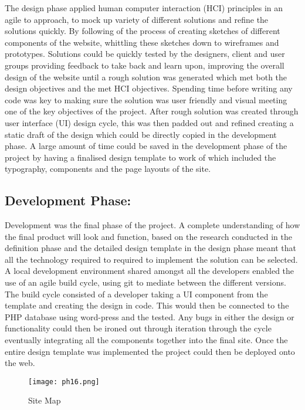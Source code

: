 The design phase applied human computer interaction (HCI) principles in
an agile to approach, to mock up variety of different solutions and
refine the solutions quickly. By following of the process of creating
sketches of different components of the website, whittling these
sketches down to wireframes and prototypes. Solutions could be quickly
tested by the designers, client and user groups providing feedback to
take back and learn upon, improving the overall design of the website
until a rough solution was generated which met both the design
objectives and the met HCI objectives. Spending time before writing any
code was key to making sure the solution was user friendly and visual
meeting one of the key objectives of the project. After rough solution
was created through user interface (UI) design cycle, this was then
padded out and refined creating a static draft of the design which could
be directly copied in the development phase. A large amount of time
could be saved in the development phase of the project by having a
finalised design template to work of which included the typography,
components and the page layouts of the site.

\hypertarget{development-phase}{%
\subsection{Development Phase:}\label{development-phase}}

Development was the final phase of the project. A complete understanding
of how the final product will look and function, based on the research
conducted in the definition phase and the detailed design template in
the design phase meant that all the technology required to required to
implement the solution can be selected. A local development environment
shared amongst all the developers enabled the use of an agile build
cycle, using git to mediate between the different versions. The build
cycle consisted of a developer taking a UI component from the template
and creating the design in code. This would then be connected to the PHP
database using word-press and the tested. Any bugs in either the design
or functionality could then be ironed out through iteration through the
cycle eventually integrating all the components together into the final
site. Once the entire design template was implemented the project could
then be deployed onto the web.

\begin{figure}[H]
      \centering
      \texttt{[image: ph16.png]}
      \caption{Site Map}
      \label{SiteMap}
 \end{figure}

